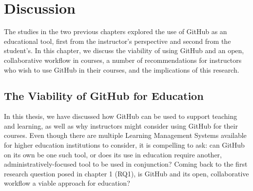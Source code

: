 \chapter{Discussion}
The studies in the two previous chapters explored the use of GitHub as an educational tool, first from the instructor's perspective and second from the student's. In this chapter, we discuss the viability of using GitHub and an open, collaborative workflow in courses, a number of recommendations for instructors who wish to use GitHub in their courses, and the implications of this research.

\section{The Viability of GitHub for Education}
In this thesis, we have discussed how GitHub can be used to support teaching and learning, as well as why instructors might consider using GitHub for their courses. Even though there are multiple Learning Management Systems available for higher education institutions to consider, it is compelling to ask: can GitHub on its own be one such tool, or does its use in education require another, administratively-focused tool to be used in conjunction? Coming back to the first research question posed in chapter 1 (RQ1), is GitHub and its open, collaborative workflow a viable approach for education?

